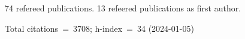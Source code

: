 74 refereed publications. 13 refeered publications as first author.

Total citations~=~3708; h-index~=~34 (2024-01-05)
